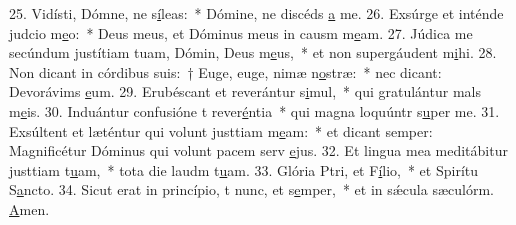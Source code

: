 25. Vidísti, Dómne, ne s\uline{í}leas:~* Dómine, ne discéds \uline{a} me.
26. Exsúrge et inténde judcio m\uline{e}o:~* Deus meus, et Dóminus meus in causm m\uline{e}am.
27. Júdica me secúndum justítiam tuam, Dómin, Deus m\uline{e}us,~* et non supergáudent m\uline{i}hi.
28. Non dicant in córdibus suis:~† Euge, euge, nimæ n\uline{o}stræ:~* nec dicant: Devorávims \uline{e}um.
29. Erubéscant et reverántur s\uline{i}mul,~* qui gratulántur mals m\uline{e}is.
30. Induántur confusióne t rever\uline{é}ntia~* qui magna loquúntr s\uline{u}per me.
31. Exsúltent et læténtur qui volunt justtiam m\uline{e}am:~* et dicant semper: Magnificétur Dóminus qui volunt pacem serv \uline{e}jus.
32. Et lingua mea meditábitur justtiam t\uline{u}am,~* tota die laudm t\uline{u}am.
33. Glória Ptri, et F\uline{í}lio,~* et Spirítu S\uline{a}ncto.
34. Sicut erat in princípio, t nunc, et s\uline{e}mper,~* et in sǽcula sæculórm. \uline{A}men.
